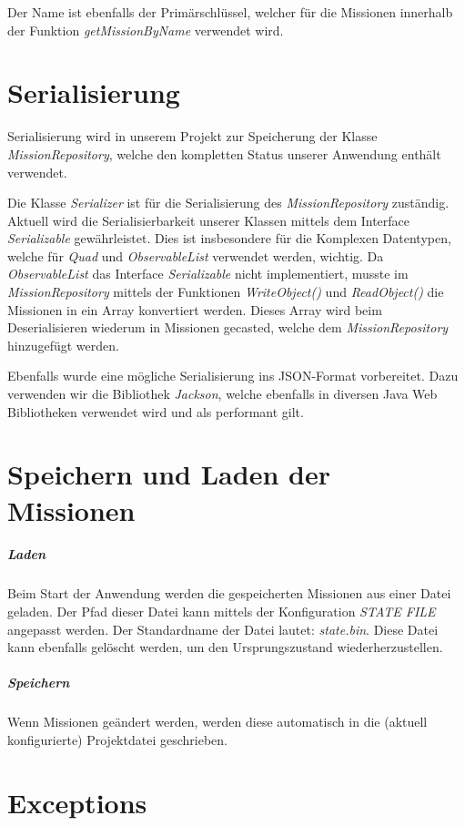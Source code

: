 Der Name ist ebenfalls der Primärschlüssel, welcher für die Missionen innerhalb der Funktion \textit{getMissionByName} verwendet wird.

\section{Serialisierung}

Serialisierung wird in unserem Projekt zur Speicherung der Klasse \textit{MissionRepository}, welche den kompletten Status unserer Anwendung enthält verwendet.

Die Klasse \textit{Serializer} ist für die Serialisierung des \textit{MissionRepository} zuständig.
Aktuell wird die Serialisierbarkeit unserer Klassen mittels dem Interface \textit{Serializable} gewährleistet.
Dies ist insbesondere für die Komplexen Datentypen, welche für \textit{Quad} und \textit{ObservableList} verwendet werden, wichtig.
Da \textit{ObservableList} das Interface \textit{Serializable} nicht implementiert, musste im \textit{MissionRepository} mittels der Funktionen \textit{WriteObject()} und \textit{ReadObject()} die Missionen in ein Array konvertiert werden. Dieses Array wird beim Deserialisieren wiederum in Missionen gecasted, welche dem \textit{MissionRepository} hinzugefügt werden.

Ebenfalls wurde eine mögliche Serialisierung ins JSON-Format vorbereitet. Dazu verwenden wir die Bibliothek \textit{Jackson}, welche ebenfalls in diversen Java Web Bibliotheken verwendet wird und als performant gilt.

\section{Speichern und Laden der Missionen}

\subparagraph{Laden}
Beim Start der Anwendung werden die gespeicherten Missionen aus einer Datei geladen.
Der Pfad dieser Datei kann mittels der Konfiguration \textit{STATE FILE} angepasst werden.
Der Standardname der Datei lautet: \textit{state.bin}.
Diese Datei kann ebenfalls gelöscht werden, um den Ursprungszustand wiederherzustellen.

\subparagraph{Speichern}
Wenn Missionen geändert werden, werden diese automatisch in die (aktuell konfigurierte) Projektdatei geschrieben.


\section{Exceptions}

